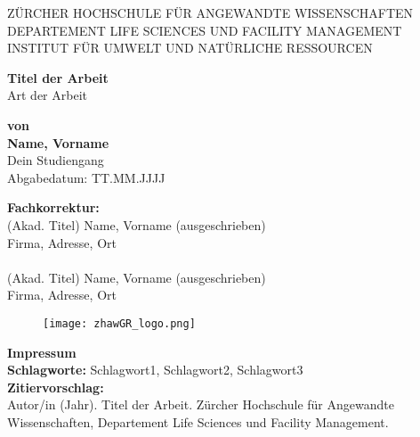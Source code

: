 \documentclass[a4paper,12pt,twoside]{article}
\begin{document}
	
	\begin{titlepage}
		\centering
		{\large \MakeUppercase{Zürcher Hochschule für Angewandte Wissenschaften}\\
			\MakeUppercase{Departement Life Sciences und Facility Management}\\
			\MakeUppercase{Institut für Umwelt und natürliche Ressourcen}\\[1.5cm]}
		
		{\Large \textbf{Titel der Arbeit}\\[1cm]}
		{\large{Art der Arbeit}\\[2cm]}
		
		\begin{center}
			\textbf{von}\\
			\textbf{Name, Vorname}\\
			Dein Studiengang\\
			Abgabedatum: TT.MM.JJJJ
		\end{center}
		
		\vspace{1cm}
		\begin{tabbing}
			\textbf{Fachkorrektur:} \\
			(Akad. Titel) Name, Vorname (ausgeschrieben)\\
			Firma, Adresse, Ort\\
			\\%
			(Akad. Titel) Name, Vorname (ausgeschrieben)\\
			Firma, Adresse, Ort\\
		\end{tabbing}
			
		\vfill
		\begin{figure}[t]
			\raggedleft
			\texttt{[image: zhawGR\_logo.png]} %
		\end{figure}
	\end{titlepage}
	
	
	\newpage
	\thispagestyle{empty}
	\vspace*{18cm}
	\noindent
	\textbf{Impressum}\\[1cm]
	\textbf{Schlagworte:} Schlagwort1, Schlagwort2, Schlagwort3\\[0.5cm]
	\textbf{Zitiervorschlag:}\\
	Autor/in (Jahr). Titel der Arbeit. Zürcher Hochschule für Angewandte Wissenschaften, Departement Life Sciences und Facility Management.
	
\end{document}
